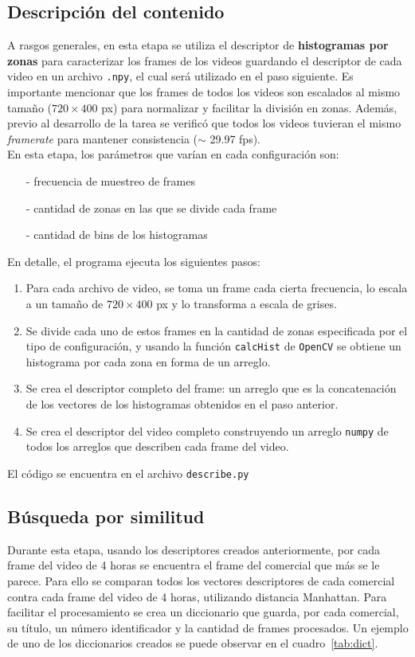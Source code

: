 \documentclass[14pt,letterpaper,hidelinks]{extarticle}
\begin{document}
\subsection{Descripción del contenido}
A rasgos generales, en esta etapa se utiliza el descriptor de \textbf{histogramas por zonas} para caracterizar los frames de los videos guardando el descriptor de cada video en un archivo \verb+.npy+, el cual será utilizado en el paso siguiente. Es importante mencionar que los frames de todos los videos son escalados al mismo tamaño ($720\times400$ px) para normalizar y facilitar la división en zonas. Además, previo al desarrollo de la tarea se verificó que todos los videos tuvieran el mismo \textit{framerate} para mantener consistencia ($\sim$ 29.97 fps).\\

En esta etapa, los parámetros que varían en cada configuración son:
\begin{itemize}
\item[-] frecuencia de muestreo de frames
\item[-] cantidad de zonas en las que se divide cada frame
\item[-] cantidad de bins de los histogramas 
\end{itemize}

En detalle, el programa ejecuta los siguientes pasos:
\begin{enumerate}
\item Para cada archivo de video, se toma un frame cada cierta frecuencia, lo escala a un tamaño de $720\times400$ px y lo transforma a escala de grises.
\item Se divide cada uno de estos frames en la cantidad de zonas especificada por el tipo de configuración, y usando la función \verb+calcHist+ de \verb+OpenCV+ se obtiene un histograma por cada zona en forma de un arreglo.
\item Se crea el descriptor completo del frame: un arreglo que es la concatenación de los vectores de los histogramas obtenidos en el paso anterior.
\item Se crea el descriptor del video completo construyendo un arreglo \verb+numpy+ de todos los arreglos que describen cada frame del video.
\end{enumerate}

El código se encuentra en el archivo \verb+describe.py+

\subsection{Búsqueda por similitud}
Durante esta etapa, usando los descriptores creados anteriormente, por cada frame del video de 4 horas se encuentra el frame del comercial que más se le parece. Para ello se comparan todos los vectores descriptores de cada comercial contra cada frame del video de 4 horas, utilizando distancia Manhattan. Para facilitar el procesamiento se crea un diccionario que guarda, por cada comercial, su título, un número identificador y la cantidad de frames procesados. Un ejemplo de uno de los diccionarios creados se puede observar en el cuadro~\ref{tab:dict}.\\
\end{document}
